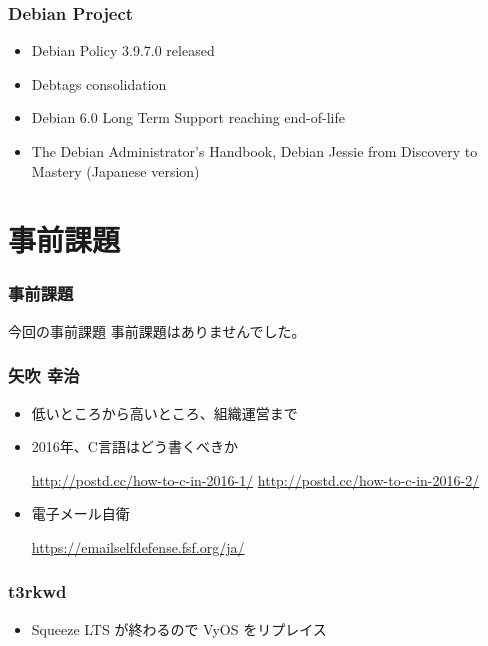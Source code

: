 \documentclass[cjk,dvipdfmx,10pt,compress,%
hyperref={bookmarks=true,bookmarksnumbered=true,bookmarksopen=false,%
colorlinks=false,%
pdftitle={第 107 回 関西 Debian 勉強会},%
pdfauthor={倉敷・のがた・佐々木・かわだ},%
pdfsubject={資料},%
}]{beamer}
\begin{document}
\begin{frame}[fragile]
  \frametitle{Debian Project}
  \begin{itemize}
  \item Debian Policy 3.9.7.0 released
  \item Debtags consolidation
  \item Debian 6.0 Long Term Support reaching end-of-life
  \item The Debian Administrator's Handbook, Debian Jessie from Discovery to Mastery (Japanese version)
  \end{itemize}
\end{frame}


\section{事前課題}

\begin{frame}[fragile]
  \frametitle{事前課題}
  \begin{block}{今回の事前課題}
    事前課題はありませんでした。
  \end{block}
\end{frame}


\begin{frame}
  \frametitle{ 矢吹 幸治 }
  \begin{itemize}
  \item 低いところから高いところ、組織運営まで
  \item 2016年、C言語はどう書くべきか

    \url{http://postd.cc/how-to-c-in-2016-1/}
    \url{http://postd.cc/how-to-c-in-2016-2/}

  \item 電子メール自衛

    \url{https://emailselfdefense.fsf.org/ja/}
  \end{itemize}
\end{frame}

\begin{frame}
  \frametitle{ t3rkwd }
  \begin{itemize}
  \item Squeeze LTS が終わるので VyOS をリプレイス
  \end{itemize}
\end{frame}
\end{document}
